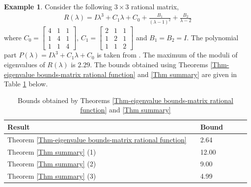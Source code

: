 \documentclass[12pt, reqno]{amsart}
\theoremstyle{definition}
\newtheorem{example}[theorem]{Example}
\theoremstyle{remark}
\numberwithin{equation}{section}
\begin{document}
\begin{example}\label{example-4.1}
Consider the following $3 \times 3$ rational matrix, 
\begin{align*}
R(\lambda) = I \lambda^3+C_1 \lambda +C_0 +\displaystyle 
\frac{B_1}{(\lambda-1)^2} + \frac{B_2}{\lambda-2} 
\end{align*}
where $C_0 =\begin{bmatrix}
4 & 1 & 1 \\
1 & 4 & 1 \\
1 & 1 & 4
\end{bmatrix}$, $C_1 =\begin{bmatrix}
2 & 1 & 1 \\
1 & 2 & 1 \\
1 & 1 & 2
\end{bmatrix}$ and $B_1 = B_2 = I$. The polynomial part $P(\lambda)= 
I \lambda^3+C_1 \lambda +C_0$ is taken from \cite{Bani-Fuad-Rawan}. 
The maximum of the moduli of eigenvalues of $R(\lambda)$ is $2.29$. 
The bounds obtained using Theorems \ref{Thm-eigenvalue bounds-matrix rational function} 
and \ref{Thm summary} are given in Table \ref{table:1} below.

\begin{table}[h!]
\centering
\begin{tabular}{l l l l l l}
\hline
Result & \hspace{5cm} & Bound \\ [0.5ex] 
\hline

Theorem \ref{Thm-eigenvalue bounds-matrix rational function} & \hspace{5cm} & 2.64\\
Theorem \ref{Thm summary} (1) & \hspace{5cm} & 12.00\\
Theorem \ref{Thm summary} (2) & \hspace{5cm} & 9.00\\
Theorem \ref{Thm summary} (3) & \hspace{5cm} & 4.99\\[1ex] 
\hline 
\end{tabular}
\vspace{0.2cm}
\caption{Bounds obtained by Theorems \ref{Thm-eigenvalue bounds-matrix rational function} 
and \ref{Thm summary}}
\label{table:1}
\end{table} 
\end{example}
\end{document}
